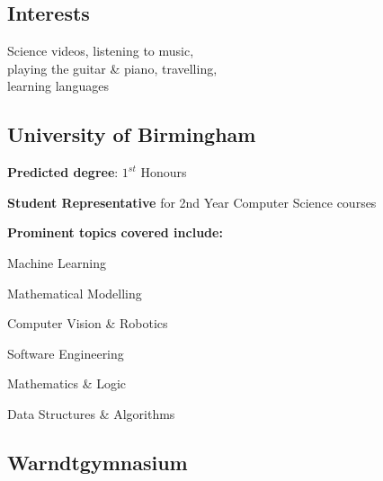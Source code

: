 \documentclass[]{jonas-cv}
\begin{document}
\begin{minipage}[t]{0.33\textwidth}
\subsection{Interests}
Science videos, listening to music,\\
playing the guitar \& piano, travelling,\\
learning languages

\largesectionsep

\tinysectionsep
\vspace{0.25mm}


\subsection{University of Birmingham}

\begin{tightemize}
    \item \textbf{Predicted degree}: $1^{st}$ Honours
    \item \textbf{Student Representative} for 2nd Year Computer Science courses
    \item \textbf{Prominent topics covered include:}\\
    \vspace{1mm}
    \begin{tightemize}
        \item Machine Learning \\
        \item Mathematical Modelling \\
        \item Computer Vision \& Robotics \\
        \item Software Engineering \\
        \item Mathematics \& Logic \\
        \item Data Structures \& Algorithms \\
    \end{tightemize}
\end{tightemize}
\largesectionsep


\subsection{Warndtgymnasium}


\end{minipage}
\end{document}
